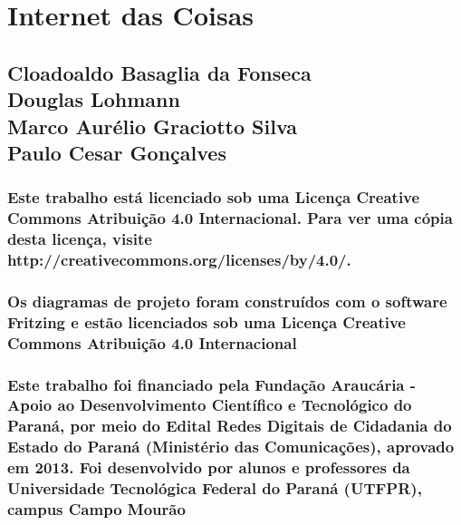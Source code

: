 
\pagestyle{fancy}
\renewcommand{\chaptermark}[1]{\markboth{#1}{}}
\renewcommand{\sectionmark}[1]{\markright{\thesection\ #1}}
\fancyhf{}
\fancyhead[LE,RO]{\bfseries\thepage}
\fancyhead[LO]{\bfseries\rightmark}
\fancyhead[RE]{\bfseries\leftmark}
\renewcommand{\headrulewidth}{0.5pt}
\renewcommand{\footrulewidth}{0pt}
\addtolength{\headheight}{0.5pt}
\setlength{\footskip}{0in}
\renewcommand{\footruleskip}{0pt}
\fancypagestyle{plain}{%
\fancyhead{}
\renewcommand{\headrulewidth}{0pt}
}
%
\parskip 0.05in
%

\frontmatter
%
\chapter*{\Huge \center Internet das Coisas }
\thispagestyle{empty}
\section*{\center Cloadoaldo Basaglia da Fonseca \\Douglas Lohmann \\Marco Aurélio Graciotto Silva \\Paulo Cesar Gonçalves}
\newpage

\subsection*{\center \normalsize Este trabalho está licenciado sob uma Licença Creative Commons Atribuição 4.0 Internacional. Para ver uma cópia desta licença, visite \\ http://creativecommons.org/licenses/by/4.0/.}

\subsection*{\center \normalsize Os diagramas de projeto foram construídos com o software Fritzing e estão licenciados sob uma Licença Creative Commons Atribuição 4.0 Internacional}

\subsection*{\center \normalsize Este trabalho foi financiado pela Fundação Araucária - Apoio ao Desenvolvimento Científico e Tecnológico do Paraná, por meio do Edital Redes Digitais de Cidadania do Estado do Paraná (Ministério das Comunicações), aprovado em 2013. Foi desenvolvido por alunos e professores da  Universidade Tecnológica Federal do Paraná (UTFPR), campus Campo Mourão}

